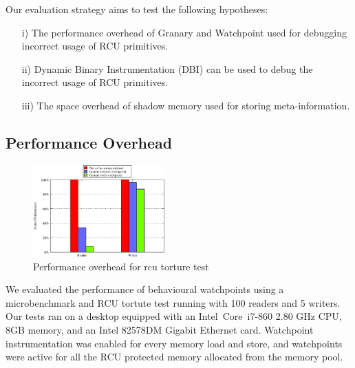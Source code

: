 Our evaluation strategy aims to test the following hypotheses:
\begin{enumerate}
	\item[i)] The performance overhead of Granary and Watchpoint used for debugging incorrect usage of RCU primitives.
	\item[ii)] Dynamic Binary Instrumentation (DBI) can be used to debug the incorrect usage of RCU primitives.
	\item[iii)] The space overhead of shadow memory used for storing meta-information.
\end{enumerate}

\subsection{Performance Overhead}
\begin{figure}
\centering
 	\includegraphics[width=0.45\textwidth]{performance}
\caption{Performance overhead for rcu torture test}\label{fig:perf}
\end{figure}
We evaluated the performance of behavioural watchpoints using a microbenchmark and RCU tortute test running with 100 readers and 5 writers. Our tests ran on a desktop equipped with an Intel\textregistered\ Core\texttrademark\ i7-860 2.80 GHz CPU, 8GB memory, and an Intel 82578DM Gigabit Ethernet card. Watchpoint instrumentation was enabled for every memory load and store, and watchpoints were active for all the RCU protected memory allocated from the memory pool.

